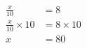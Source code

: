 \documentclass[varwidth]{standalone}
\begin{document}
    \begin{varwidth}{0.25\paperwidth}
    \begin{align*}
    \frac{x}{10} &= 8\\
    \frac{x}{10} \times10 &= 8 \times10\\
    x &= 80\\
\end{align*}
\end{varwidth}
\end{document}
